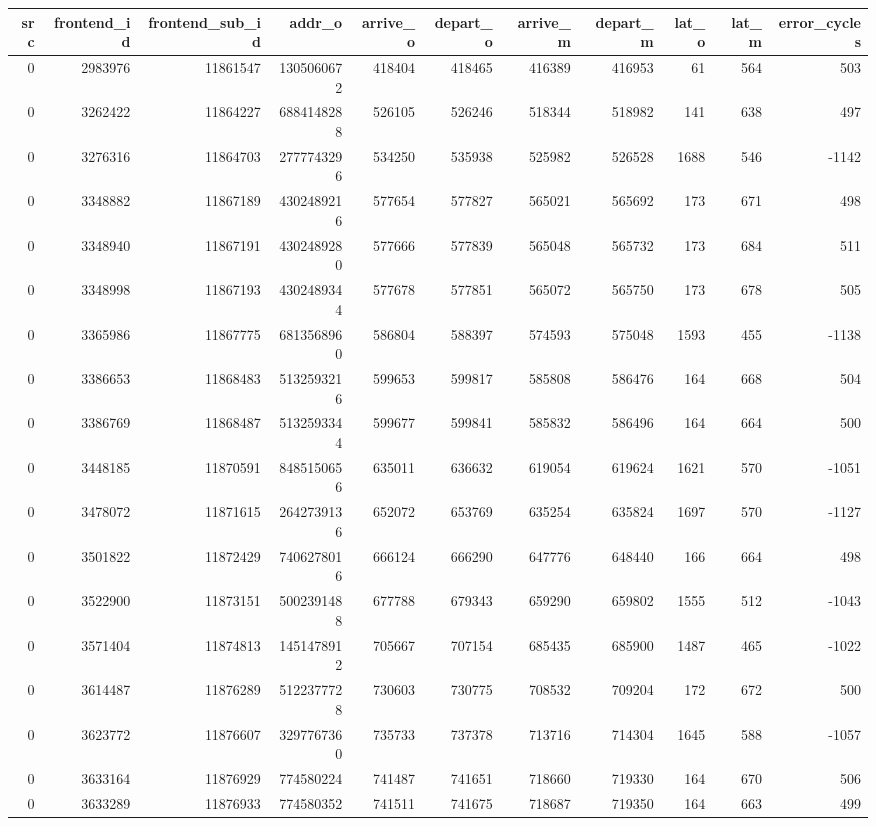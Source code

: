 \begin{tabular}{rrrrrrrrrrr}
\toprule
src & frontend\_id & frontend\_sub\_id & addr\_o & arrive\_o & depart\_o & arrive\_m & depart\_m & lat\_o & lat\_m & error\_cycles \\
\midrule
0 & 2983976 & 11861547 & 1305060672 & 418404 & 418465 & 416389 & 416953 & 61 & 564 & 503 \\
0 & 3262422 & 11864227 & 6884148288 & 526105 & 526246 & 518344 & 518982 & 141 & 638 & 497 \\
0 & 3276316 & 11864703 & 2777743296 & 534250 & 535938 & 525982 & 526528 & 1688 & 546 & -1142 \\
0 & 3348882 & 11867189 & 4302489216 & 577654 & 577827 & 565021 & 565692 & 173 & 671 & 498 \\
0 & 3348940 & 11867191 & 4302489280 & 577666 & 577839 & 565048 & 565732 & 173 & 684 & 511 \\
0 & 3348998 & 11867193 & 4302489344 & 577678 & 577851 & 565072 & 565750 & 173 & 678 & 505 \\
0 & 3365986 & 11867775 & 6813568960 & 586804 & 588397 & 574593 & 575048 & 1593 & 455 & -1138 \\
0 & 3386653 & 11868483 & 5132593216 & 599653 & 599817 & 585808 & 586476 & 164 & 668 & 504 \\
0 & 3386769 & 11868487 & 5132593344 & 599677 & 599841 & 585832 & 586496 & 164 & 664 & 500 \\
0 & 3448185 & 11870591 & 8485150656 & 635011 & 636632 & 619054 & 619624 & 1621 & 570 & -1051 \\
0 & 3478072 & 11871615 & 2642739136 & 652072 & 653769 & 635254 & 635824 & 1697 & 570 & -1127 \\
0 & 3501822 & 11872429 & 7406278016 & 666124 & 666290 & 647776 & 648440 & 166 & 664 & 498 \\
0 & 3522900 & 11873151 & 5002391488 & 677788 & 679343 & 659290 & 659802 & 1555 & 512 & -1043 \\
0 & 3571404 & 11874813 & 1451478912 & 705667 & 707154 & 685435 & 685900 & 1487 & 465 & -1022 \\
0 & 3614487 & 11876289 & 5122377728 & 730603 & 730775 & 708532 & 709204 & 172 & 672 & 500 \\
0 & 3623772 & 11876607 & 3297767360 & 735733 & 737378 & 713716 & 714304 & 1645 & 588 & -1057 \\
0 & 3633164 & 11876929 & 774580224 & 741487 & 741651 & 718660 & 719330 & 164 & 670 & 506 \\
0 & 3633289 & 11876933 & 774580352 & 741511 & 741675 & 718687 & 719350 & 164 & 663 & 499 \\

\end{tabular}
